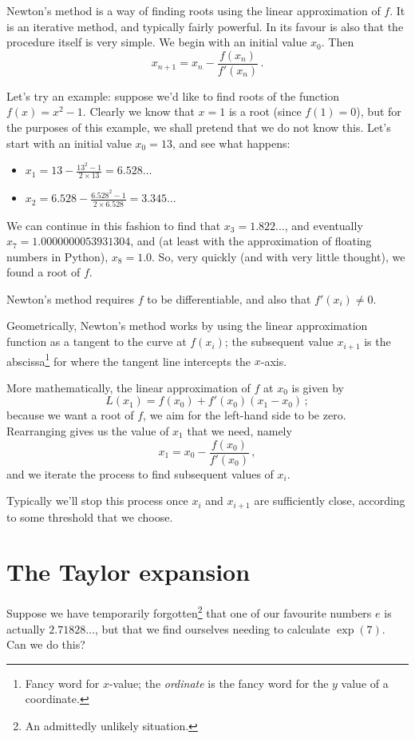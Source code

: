\documentclass[12pt]{article}
\begin{document}
Newton's method is a way of finding roots using the linear approximation of $f$. It is an iterative method, and typically fairly powerful. In its favour is also that the procedure itself is very simple. We begin with an initial value $x_0$. Then 
\begin{equation}
    x_{n+1} = x_n - \frac{f(x_n)}{f'(x_n)}\,.
\end{equation}

Let's try an example: suppose we'd like to find roots of the function $f(x) = x^2 - 1$. Clearly we know that $x=1$ is a root (since $f(1) = 0$), but for the purposes of this example, we shall pretend that we do not know this. Let's start with an initial value $x_0=13$, and see what happens:\\
\begin{itemize}
    \item $x_1 = 13 - \frac{13^2 - 1}{2\times13} = 6.528\dots$
    \item $x_2 = 6.528 - \frac{6.528^2 -1 }{2\times 6.528} = 3.345\dots$
\end{itemize}
We can continue in this fashion to find that $x_3 = 1.822...$, and eventually $x_7 = 1.0000000053931304$, and (at least with the approximation of floating numbers in Python), $x_8 = 1.0$. So, very quickly (and with very little thought), we found a root of $f$.

Newton's method requires $f$ to be differentiable, and also that $f'(x_i)\neq 0$. 

Geometrically, Newton's method works by using the linear approximation function as a tangent to the curve at $f(x_i)$; the subsequent value $x_{i+1}$ is the abscissa\footnote{Fancy word for $x$-value; the \emph{ordinate} is the fancy word for the $y$ value of a coordinate.} for where the tangent line intercepts the $x$-axis. 

More mathematically, the linear approximation of $f$ at $x_0$ is given by
\[
L(x_1) = f(x_0) + f'(x_0)(x_1 - x_0)\,;
\]
because we want a root of $f$, we aim for the left-hand side to be zero. Rearranging gives us the value of $x_1$ that we need, namely
\[
x_1 = x_0 - \frac{f(x_0)}{f'(x_0)}\,,
\]
and we iterate the process to find subsequent values of $x_i$.

Typically we'll stop this process once $x_i$ and $x_{i+1}$ are sufficiently close, according to some threshold that we choose. 



\section*{The Taylor expansion}
Suppose we have temporarily forgotten\footnote{An admittedly unlikely situation.} that one of our favourite numbers $e$ is actually $2.71828\dots$, but that we find ourselves needing to calculate $\exp(7)$. Can we do this? 
\end{document}
